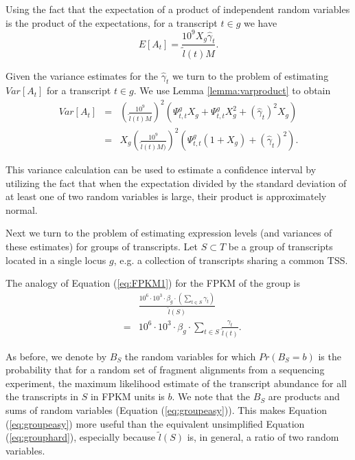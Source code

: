 \documentclass[12pt]{amsart}
\theoremstyle{definition}
\begin{document}
Using the fact that the expectation of a product of independent random
variables is the product of the expectations, for a transcript $t \in g$ we
have
\begin{equation}
E[A_t] = \frac{10^9X_{g}\hat{\gamma}_t}{\tilde{l}(t)M}.
\end{equation}

Given the variance estimates for the $\hat{\gamma}_t$ we turn to the problem of estimating $Var[A_t]$ for a transcript $t \in g$. We use Lemma \ref{lemma:varproduct} to obtain
\begin{eqnarray}
Var[A_t]& =  & \left(\frac{10^9}{\tilde{l}(t)M}\right)^2 \left( \Psi^g_{t,t}X_{g} + \Psi^g_{t,t}X^2_{g} + (\hat{\gamma}_t)^2 X_{g} \right)\\
& = & X_{g}\left(\frac{10^9}{\tilde{l}(t)M)}\right)^2  \left( \Psi^g_{t,t}(1+X_{g}) + (\hat{\gamma}_t)^2\right).
\end{eqnarray}

This variance calculation can be used to estimate a confidence interval by
utilizing the fact \cite{Aroian1978} that when the expectation divided by the
standard deviation of at least one of two random variables is large, their
product is approximately normal.

Next we turn to the problem of estimating expression levels (and variances of
these estimates) for groups of transcripts. Let $S \subset T$ be a group of
transcripts located in a single locus $g$, e.g. a collection of transcripts
sharing a common TSS.

The analogy of Equation (\ref{eq:FPKM1}) for the FPKM of the group is
\begin{eqnarray}
\label{eq:grouphard}
& & \frac{10^6 \cdot 10^3 \cdot \beta_g \cdot \left( \sum_{t \in S} \gamma_t\right)}{\tilde{l}(S)}\\ 
& = & 10^6 \cdot 10^3 \cdot \beta_g \cdot \sum_{t \in S} \frac{\gamma_t}{\tilde{l}(t)}. \label{eq:groupeasy}
\end{eqnarray}

As before, we denote by $B_S$ the random variables for which $Pr(B_S = b)$ is
the probability that for a random set of fragment alignments from a sequencing
experiment, the maximum likelihood estimate of the transcript abundance for
all the transcripts in $S$ in FPKM units is $b$. We note that the $B_S$ are
products and sums of random variables (Equation (\ref{eq:groupeasy})). This
makes Equation (\ref{eq:groupeasy})  more useful than the
equivalent unsimplified Equation (\ref{eq:grouphard}), especially because
$\tilde{l}(S)$ is, in general, a ratio of two random variables.
\end{document}
